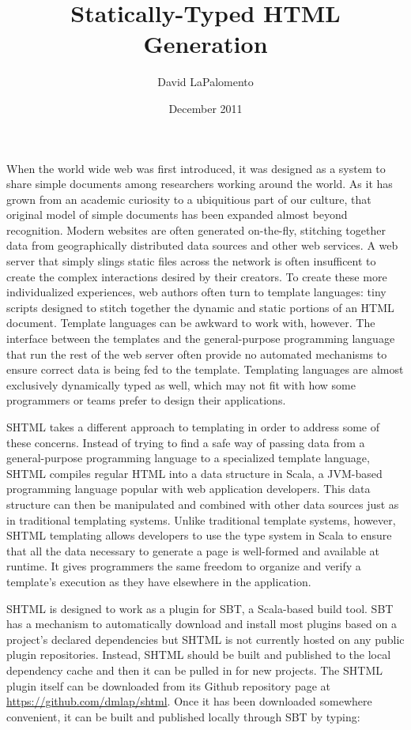 \documentclass{article}
\title{Statically-Typed HTML Generation}
\author{David LaPalomento}
\date{December 2011}
\begin{document}
\maketitle
When the world wide web was first introduced, it was designed as a system to share simple documents among researchers working around the world. As it has grown from an academic curiosity to a ubiquitious part of our culture, that original model of simple documents has been expanded almost beyond recognition. Modern websites are often generated on-the-fly, stitching together data from geographically distributed data sources and other web services. A web server that simply slings static files across the network is often insufficent to create the complex interactions desired by their creators. To create these more individualized experiences, web authors often turn to template languages: tiny scripts designed to stitch together the dynamic and static portions of an HTML document. Template languages can be awkward to work with, however. The interface between the templates and the general-purpose programming language that run the rest of the web server often provide no automated mechanisms to ensure correct data is being fed to the template. Templating languages are almost exclusively dynamically typed as well, which may not fit with how some programmers or teams prefer to design their applications.

SHTML takes a different approach to templating in order to address some of these concerns. Instead of trying to find a safe way of passing data from a general-purpose programming language to a specialized template language, SHTML compiles regular HTML into a data structure in Scala, a JVM-based programming language popular with web application developers. This data structure can then be manipulated and combined with other data sources just as in traditional templating systems. Unlike traditional template systems, however, SHTML templating allows developers to use the type system in Scala to ensure that all the data necessary to generate a page is well-formed and available at runtime. It gives programmers the same freedom to organize and verify a template's execution as they have elsewhere in the application.

SHTML is designed to work as a plugin for SBT, a Scala-based build tool. SBT has a mechanism to automatically download and install most plugins based on a project's declared dependencies but SHTML is not currently hosted on any public plugin repositories. Instead, SHTML should be built and published to the local dependency cache and then it can be pulled in for new projects. The SHTML plugin itself can be downloaded from its Github repository page at \url{https://github.com/dmlap/shtml}. Once it has been downloaded somewhere convenient, it can be built and published locally through SBT by typing:
\end{document}
